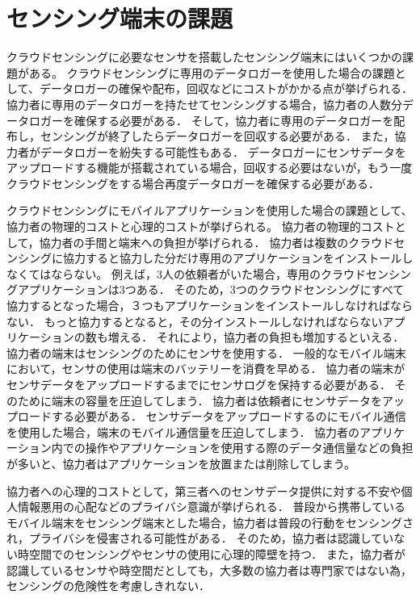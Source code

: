 \section{センシング端末の課題}

クラウドセンシングに必要なセンサを搭載したセンシング端末にはいくつかの課題がある。
クラウドセンシングに専用のデータロガーを使用した場合の課題として、データロガーの確保や配布，回収などにコストがかかる点が挙げられる．
協力者に専用のデータロガーを持たせてセンシングする場合，協力者の人数分データロガーを確保する必要がある．
そして，協力者に専用のデータロガーを配布し，センシングが終了したらデータロガーを回収する必要がある．
また，協力者がデータロガーを紛失する可能性もある．
データロガーにセンサデータをアップロードする機能が搭載されている場合，回収する必要はないが，もう一度クラウドセンシングをする場合再度データロガーを確保する必要がある．

クラウドセンシングにモバイルアプリケーションを使用した場合の課題として、協力者の物理的コストと心理的コストが挙げられる。
協力者の物理的コストとして，協力者の手間と端末への負担が挙げられる．
協力者は複数のクラウドセンシングに協力すると協力した分だけ専用のアプリケーションをインストールしなくてはならない。
例えば，3人の依頼者がいた場合，専用のクラウドセンシングアプリケーションは3つある．
そのため，3つのクラウドセンシングにすべて協力するとなった場合，３つもアプリケーションをインストールしなければならない．
もっと協力するとなると，その分インストールしなければならないアプリケーションの数も増える．
それにより，協力者の負担も増加するといえる．
協力者の端末はセンシングのためにセンサを使用する．
一般的なモバイル端末において，センサの使用は端末のバッテリーを消費を早める．
協力者の端末がセンサデータをアップロードするまでにセンサログを保持する必要がある．
そのために端末の容量を圧迫してしまう．
協力者は依頼者にセンサデータをアップロードする必要がある．
センサデータをアップロードするのにモバイル通信を使用した場合，端末のモバイル通信量を圧迫してしまう．
協力者のアプリケーション内での操作やアプリケーションを使用する際のデータ通信量などの負担が多いと、協力者はアプリケーションを放置または削除してしまう。

協力者への心理的コストとして，第三者へのセンサデータ提供に対する不安や個人情報悪用の心配などのプライバシ意識が挙げられる．
普段から携帯しているモバイル端末をセンシング端末とした場合，協力者は普段の行動をセンシングされ，プライバシを侵害される可能性がある．
そのため，協力者は認識していない時空間でのセンシングやセンサの使用に心理的障壁を持つ．
また，協力者が認識しているセンサや時空間だとしても，大多数の協力者は専門家ではない為，センシングの危険性を考慮しきれない．

